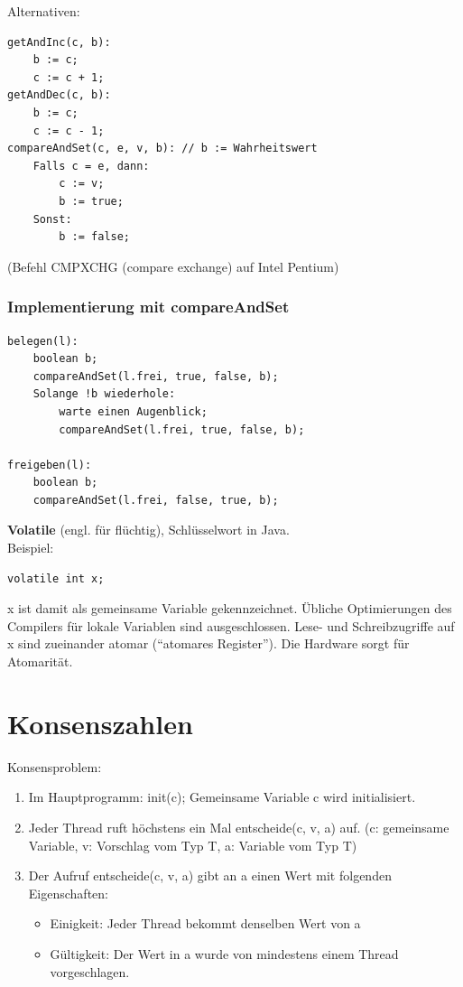 Alternativen:

\begin{lstlisting}
getAndInc(c, b):
	b := c;
	c := c + 1;
getAndDec(c, b):
	b := c;
	c := c - 1;
compareAndSet(c, e, v, b): // b := Wahrheitswert
	Falls c = e, dann:
		c := v;
		b := true;
	Sonst:
		b := false;
\end{lstlisting}
(Befehl CMPXCHG (compare exchange) auf Intel Pentium)

\subsubsection*{Implementierung mit compareAndSet}

\begin{lstlisting}
belegen(l):
	boolean b;
	compareAndSet(l.frei, true, false, b);
	Solange !b wiederhole:
		warte einen Augenblick;
		compareAndSet(l.frei, true, false, b);

freigeben(l):
	boolean b;
	compareAndSet(l.frei, false, true, b);
\end{lstlisting}

\textbf{Volatile} (engl. für flüchtig), Schlüsselwort in Java.\\
Beispiel:
\begin{lstlisting}
volatile int x;
\end{lstlisting}
x ist damit als gemeinsame Variable gekennzeichnet. Übliche Optimierungen des Compilers für lokale Variablen sind ausgeschlossen. Lese- und Schreibzugriffe auf x sind zueinander atomar ("`atomares Register"'). Die Hardware sorgt für Atomarität.

\pagebreak

\section{Konsenszahlen}

Konsensproblem:
\begin{enumerate}
	\item Im Hauptprogramm: init(c); Gemeinsame Variable c wird initialisiert.
	\item Jeder Thread ruft höchstens ein Mal entscheide(c, v, a) auf. (c: gemeinsame Variable, v: Vorschlag vom Typ T, a: Variable vom Typ T)
	\item Der Aufruf entscheide(c, v, a) gibt an a einen Wert mit folgenden Eigenschaften:
	\begin{itemize}
		\item Einigkeit: Jeder Thread bekommt denselben Wert von a
		\item Gültigkeit: Der Wert in a wurde von mindestens einem Thread vorgeschlagen.
	\end{itemize}
\end{enumerate}

